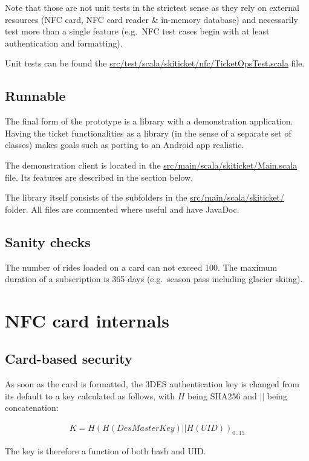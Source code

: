 \documentclass[paper=a4, fontsize=11pt]{scrartcl}
\begin{document}
Note that those are not unit tests in the strictest sense as they rely on
external resources (NFC card, NFC card reader \& in-memory database) and
necessarily test more than a single feature (e.g.\ NFC test cases begin with at
least authentication and formatting).

Unit tests can be found the 
\url{src/test/scala/skiticket/nfc/TicketOpsTest.scala} file.

\subsection{Runnable}

The final form of the prototype is a library with a demonstration application.
Having the ticket functionalities as a library (in the sense of a separate set
of classes) makes goals such as porting to an Android app realistic.

The demonstration client is located in the 
\url{src/main/scala/skiticket/Main.scala} file.
Its features are described in the section below.

The library itself consists of the subfolders in the
\url{src/main/scala/skiticket/} folder.
All files are commented where useful and have JavaDoc.

\subsection{Sanity checks}

The number of rides loaded on a card can not exceed 100.
The maximum duration of a subscription is 365 days (e.g.\ season pass including
glacier skiing).

\section{NFC card internals}

\subsection{Card-based security}

As soon as the card is formatted, the 3DES authentication key is changed from
its default to a key calculated as follows, with $H$ being SHA256 and $||$ being
concatenation:

\begin{align*}
    K = H{(H(DesMasterKey) || H(UID))}_{0..15}
\end{align*}

The key is therefore a function of both hash and UID\@.
\end{document}
